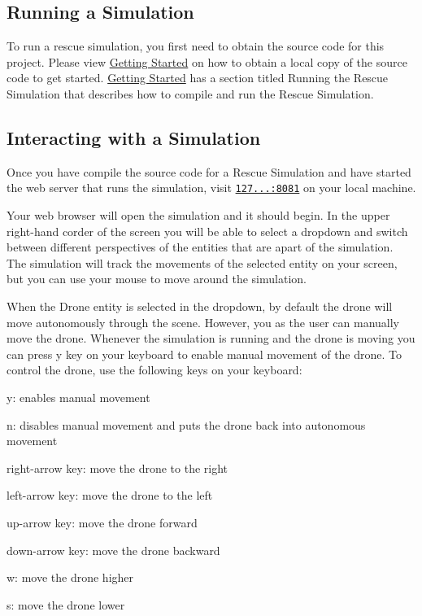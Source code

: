 \subsection*{Running a Simulation}

To run a rescue simulation, you first need to obtain the source code for this project. Please view \hyperlink{getting-started}{Getting Started} on how to obtain a local copy of the source code to get started. \hyperlink{getting-started}{Getting Started} has a section titled \textquotesingle{}Running the Rescue Simulation\textquotesingle{} that describes how to compile and run the Rescue Simulation.

\subsection*{Interacting with a Simulation}

Once you have compile the source code for a Rescue Simulation and have started the web server that runs the simulation, visit \href{http://127.0.0.1:8081/}{\tt 127...\+:8081} on your local machine.

Your web browser will open the simulation and it should begin. In the upper right-\/hand corder of the screen you will be able to select a dropdown and switch between different perspectives of the entities that are apart of the simulation. The simulation will track the movements of the selected entity on your screen, but you can use your mouse to move around the simulation.

When the {\ttfamily Drone} entity is selected in the dropdown, by default the drone will move autonomously through the scene. However, you as the user can manually move the drone. Whenever the simulation is running and the drone is moving you can press \textquotesingle{}y\textquotesingle{} key on your keyboard to enable manual movement of the drone. To control the drone, use the following keys on your keyboard\+:
\begin{DoxyItemize}
\item {\ttfamily y}\+: enables manual movement
\item {\ttfamily n}\+: disables manual movement and puts the drone back into autonomous movement
\item {\ttfamily right-\/arrow key}\+: move the drone to the right
\item {\ttfamily left-\/arrow key}\+: move the drone to the left
\item {\ttfamily up-\/arrow key}\+: move the drone forward
\item {\ttfamily down-\/arrow key}\+: move the drone backward
\item {\ttfamily w}\+: move the drone higher
\item {\ttfamily s}\+: move the drone lower
\end{DoxyItemize}

